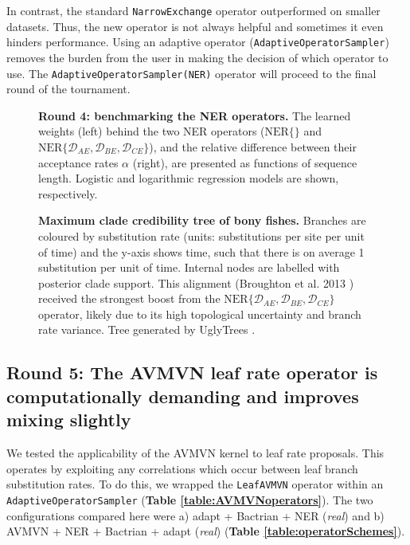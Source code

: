 \documentclass[10pt,letterpaper]{article}
\begin{document}
In contrast, the standard \texttt{NarrowExchange} operator outperformed on smaller datasets.
Thus, the new operator is not always helpful and sometimes it even hinders performance.
Using an adaptive operator (\texttt{AdaptiveOperatorSampler}) removes the burden from the user in making the decision of which operator to use.
The \texttt{AdaptiveOperatorSampler(NER)} operator will proceed to the final round of the tournament.



\begin{figure}[!h]
\caption{\textbf{Round 4: benchmarking the NER operators.} 
The learned weights (left) behind the two NER operators ($\text{NER} \{\}$ and $\text{NER}\{\mathcal{D}_{AE}, \mathcal{D}_{BE}, \mathcal{D}_{CE}\}$), and the relative difference between their acceptance rates $\alpha$ (right), are presented as functions of sequence length.
Logistic and logarithmic regression models are shown, respectively. }
\label{fig:round4Results}
\end{figure}




\begin{figure}[!h]
\caption{\textbf{Maximum clade credibility tree of bony fishes.} 
Branches are coloured by substitution rate (units: substitutions per site per unit of time) and the y-axis shows time, such that there is on average 1 substitution per unit of time.
Internal nodes are labelled with posterior clade support. 
This alignment (Broughton et al. 2013 \cite{Broughton_2013}) received the strongest boost from the $\text{NER}\{\mathcal{D}_{AE}, \mathcal{D}_{BE}, \mathcal{D}_{CE}\}$ operator, likely due to its high topological uncertainty and branch rate variance.   
Tree generated by UglyTrees \cite{uglytrees}.  }
\label{fig:parameterisationResults}
\end{figure}




\subsection*{Round 5: The AVMVN leaf rate operator is computationally demanding and improves mixing slightly}


We tested the applicability of the AVMVN kernel to leaf rate proposals.
This operates by exploiting any correlations which occur between leaf branch substitution rates.
To do this, we wrapped the \texttt{LeafAVMVN} operator within an \texttt{AdaptiveOperatorSampler} (\textbf{Table \ref{table:AVMVNoperators}}).
The two configurations compared here were a) adapt + Bactrian + NER (\textit{real}) and b) AVMVN + NER + Bactrian + adapt (\textit{real})  (\textbf{Table \ref{table:operatorSchemes}}).
\end{document}
